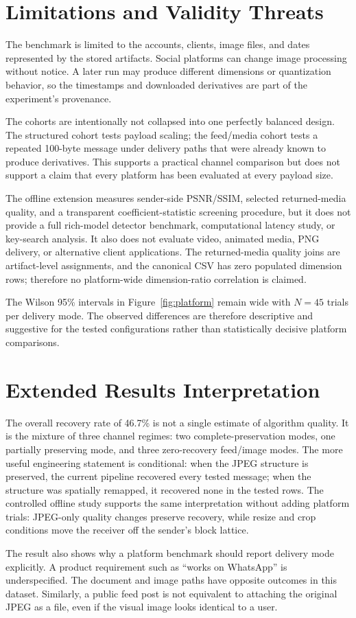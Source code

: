 \documentclass[conference]{IEEEtran}
\newcommand{\safeSection}[1]{\Needspace{5\baselineskip}\section{#1}}
\begin{document}
\safeSection{Limitations and Validity Threats}
The benchmark is limited to the accounts, clients, image files, and dates represented by the stored artifacts. Social platforms can change image processing without notice. A later run may produce different dimensions or quantization behavior, so the timestamps and downloaded derivatives are part of the experiment's provenance.

The cohorts are intentionally not collapsed into one perfectly balanced design. The structured cohort tests payload scaling; the feed/media cohort tests a repeated 100-byte message under delivery paths that were already known to produce derivatives. This supports a practical channel comparison but does not support a claim that every platform has been evaluated at every payload size.

The offline extension measures sender-side PSNR/SSIM, selected returned-media quality, and a transparent coefficient-statistic screening procedure, but it does not provide a full rich-model detector benchmark, computational latency study, or key-search analysis. It also does not evaluate video, animated media, PNG delivery, or alternative client applications. The returned-media quality joins are artifact-level assignments, and the canonical CSV has zero populated dimension rows; therefore no platform-wide dimension-ratio correlation is claimed.

The Wilson 95\% intervals in Figure~\ref{fig:platform} remain wide with $N=45$ trials per delivery mode. The observed differences are therefore descriptive and suggestive for the tested configurations rather than statistically decisive platform comparisons.

\safeSection{Extended Results Interpretation}
The overall recovery rate of 46.7\% is not a single estimate of algorithm quality. It is the mixture of three channel regimes: two complete-preservation modes, one partially preserving mode, and three zero-recovery feed/image modes. The more useful engineering statement is conditional: when the JPEG structure is preserved, the current pipeline recovered every tested message; when the structure was spatially remapped, it recovered none in the tested rows. The controlled offline study supports the same interpretation without adding platform trials: JPEG-only quality changes preserve recovery, while resize and crop conditions move the receiver off the sender's block lattice.

The result also shows why a platform benchmark should report delivery mode explicitly. A product requirement such as ``works on WhatsApp'' is underspecified. The document and image paths have opposite outcomes in this dataset. Similarly, a public feed post is not equivalent to attaching the original JPEG as a file, even if the visual image looks identical to a user.
\end{document}
